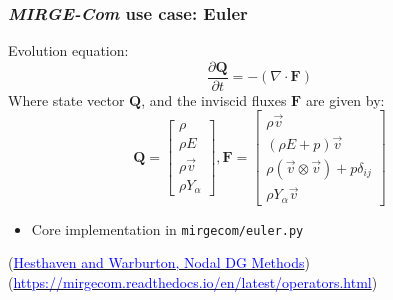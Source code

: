 \begin{frame}\frametitle{\textit{MIRGE-Com} use case: Euler}
\begin{center}
Evolution equation:
\begin{equation}
  \frac{\partial\mathbf{Q}}{\partial{t}} = - (\nabla \cdot \mathbf{F})
\end{equation}
Where state vector $\mathbf{Q}$, and the inviscid fluxes $\mathbf{F}$ are given by:
\begin{equation}
\mathbf{Q} = \begin{bmatrix} \rho\\\rho{E}\\\rho\vec{v}\\\rho{Y}_\alpha\end{bmatrix}, \mathbf{F} = \begin{bmatrix} \rho\vec{v}\\(\rho{E} + p)\vec{v}\\\rho(\vec{v} \otimes \vec{v}) + p\delta_{ij}\\\rho{Y}_\alpha\vec{v}\end{bmatrix}
\end{equation}
\begin{itemize}
\item Core implementation in \texttt{mirgecom/euler.py}
\end{itemize}
(\href{https://doi.org/10.1007/978-0-387-72067-8}{\textcolor{blue}{Hesthaven and Warburton, Nodal DG Methods}})\\
(\href{https://mirgecom.readthedocs.io/en/latest/operators.html}{\textcolor{blue}{https://mirgecom.readthedocs.io/en/latest/operators.html}})\\
\end{center}
\end{frame}
%
%
